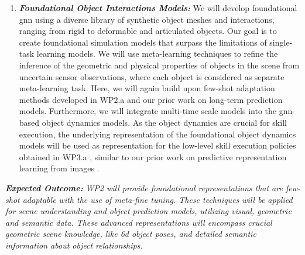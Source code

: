 \documentclass{erc-B2}
\begin{document}
\begin{enumerate}


\item \textit{\textbf{Foundational Object Interactions Models:}} %
We will develop foundational \gls*{gnn} using a diverse library of synthetic object meshes and interactions, ranging from rigid to deformable and articulated objects. Our goal is to create foundational simulation models that surpass the limitations of single-task learning models. We will use meta-learning techniques to refine the inference of the geometric and physical properties of objects in the scene from uncertain sensor observations, where each object is considered as separate meta-learning task. Here, we will again build upon few-shot adaptation methods developed in WP2.a and our prior work on long-term prediction models. 
Furthermore, we will integrate multi-time scale models \cite{shaj2023mts3} into the \gls*{gnn}-based object dynamics models. As the object dynamics are crucial for skill execution, the underlying representation of the foundational object dynamics models will be used as representation \cite{yang2023foundation} for the low-level skill execution policies obtained in WP3.a , similar to our prior work on predictive representation learning from images \cite{Becker2023archive}. 
\end{enumerate}
\textbf{\textit{Expected Outcome:}} \textit{WP2 will provide foundational representations that are few-shot adaptable with the use of meta-fine tuning.  These techniques will be applied for scene understanding and object prediction models, utilizing visual, geometric and semantic data. These advanced representations will encompass crucial geometric scene knowledge, like \gls*{6d} object poses, and detailed semantic information about object relationships.}
\end{document}
